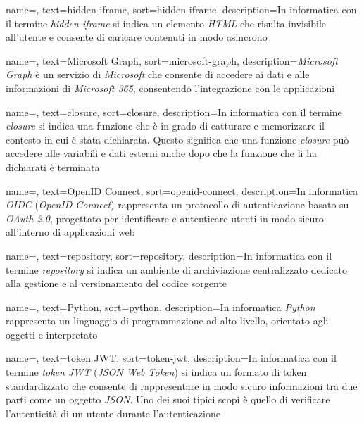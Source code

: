  {
    name=,
    text=hidden iframe,
    sort=hidden-iframe,
    description={In informatica con il termine \emph{hidden iframe} si indica un elemento \emph{HTML} che risulta invisibile all'utente e consente di caricare contenuti in modo asincrono}
}

 {
    name=,
    text=Microsoft Graph,
    sort=microsoft-graph,
    description={\emph{Microsoft Graph} è un servizio di \emph{Microsoft} che consente di accedere ai dati e alle informazioni di \emph{Microsoft 365}, consentendo l'integrazione con le applicazioni}
}

 {
    name=,
    text=closure,
    sort=closure,
    description={In informatica con il termine \emph{closure} si indica una funzione che è in grado di catturare e memorizzare il contesto in cui è stata dichiarata. Questo significa che una funzione \emph{closure} può accedere alle variabili e dati esterni anche dopo che la funzione che li ha dichiarati è terminata}
}

 {
    name=,
    text=OpenID Connect,
    sort=openid-connect,
    description={In informatica \emph{OIDC} (\emph{OpenID Connect}) rappresenta un protocollo di autenticazione basato su \emph{OAuth 2.0}, progettato per identificare e autenticare utenti in modo sicuro all'interno di applicazioni web}
}


 {
    name=,
    text=repository,
    sort=repository,
    description={In informatica con il termine \emph{repository} si indica un ambiente di ar\-chi\-via\-zio\-ne centralizzato dedicato alla gestione e al versionamento del codice sorgente}
}

 {
    name=,
    text=Python,
    sort=python,
    description={In informatica \emph{Python} rappresenta un linguaggio di programmazione ad alto livello, orientato agli oggetti e interpretato}
}


 {
    name=,
    text=token JWT,
    sort=token-jwt,
    description={In informatica con il termine \emph{token JWT} (\emph{JSON Web Token}) si indica un formato di token standardizzato che consente di rappresentare in modo sicuro informazioni tra due parti come un oggetto \emph{JSON}. Uno dei suoi tipici scopi è quello di verificare l'autenticità di un utente durante l'autenticazione} 
}


